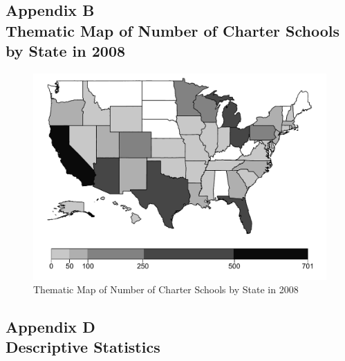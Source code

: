 \documentclass[letterpaper,12p,twoside]{article} %
\begin{document}
\subsection*{Appendix B\\Thematic Map of Number of Charter Schools by State in 2008}
\label{appendixMap}
\begin{figure}[h]
\includegraphics[width=\textwidth]{../Figures/CharterMap.pdf}
\caption{Thematic Map of Number of Charter Schools by State in 2008}
\label{fig:charterMap}
\end{figure}


\newpage
{}
\subsection*{Appendix D\\Descriptive Statistics}
\label{appendixDescriptives}

\begin{singlespace}

 \clearpage
 \clearpage

 \clearpage
 \clearpage

 \clearpage
 \clearpage

 \clearpage
 \clearpage

\end{singlespace}
\end{document}
